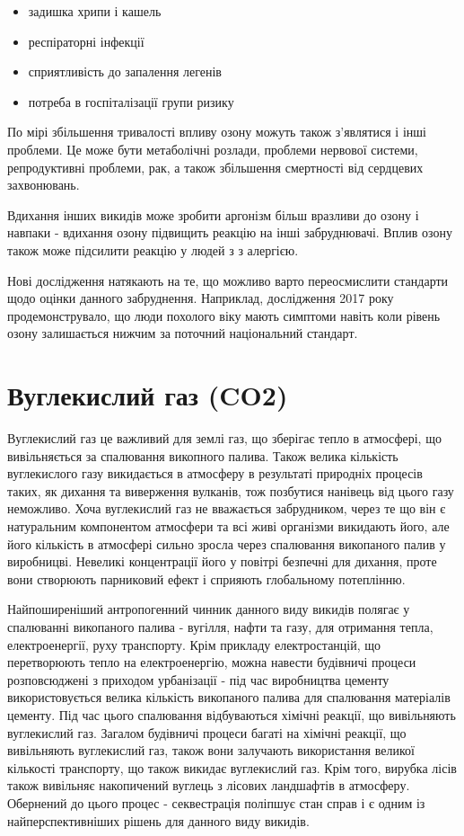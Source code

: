 \begin{itemize}
    \item задишка хрипи і кашель
    \item респіраторні інфекції
    \item сприятливість до запалення легенів
    \item потреба в госпіталізації групи ризику
\end{itemize}

По мірі збільшення тривалості впливу озону можуть також з'являтися і інші проблеми. Це може бути 
метаболічні розлади, проблеми нервової системи, репродуктивні проблеми, рак, а також збільшення 
смертності від сердцевих захвонювань. 

Вдихання інших викидів може зробити аргонізм більш вразливи до озону і навпаки - вдихання озону 
підвищить реакцію на інші забруднювачі. Вплив озону також може підсилити реакцію у людей з 
з алергією.

Нові дослідження натякають на те, що можливо варто переосмислити стандарти щодо оцінки данного
забруднення. Наприклад, дослідження 2017 року продемонструвало, що люди похолого віку мають 
симптоми навіть коли рівень озону залишається нижчим за поточний національний стандарт.


\section{Вуглекислий газ (CO2)}

Вуглекислий газ це важливий для землі газ, що зберігає тепло в атмосфері, що вивільняється за спалювання викопного палива. 
Також велика кількість вуглекислого газу викидається в атмосферу в результаті природніх процесів таких, як дихання та виверження вулканів, тож позбутися нанівець від цього газу неможливо. 
Хоча вуглекислий газ не вважається забрудником, через те що він є натуральним компонентом атмосфери та всі живі організми викидають його, але його кількість в атмосфері сильно зросла через спалювання викопаного палив у виробницві. 
Невеликі концентрації його у повітрі безпечні для дихання, проте вони створюють парниковий ефект і сприяють глобальному потеплінню.

Найпоширеніший антропогенний чинник данного виду викидів полягає у спалюванні викопаного палива - вугілля, нафти та газу, для отримання тепла, електроенергії, руху транспорту.
Крім прикладу електростанцій, що перетворюють тепло на електроенергію, можна навести будівничі процеси розповсюджені з приходом урбанізації - під час виробництва цементу використовується велика кількість викопаного палива для спалювання матеріалів цементу. 
Під час цього спалювання відбуваються хімічні реакції, що вивільняють вуглекислий газ.
Загалом будівничі процеси багаті на хімічні реакції, що вивільняють вуглекислий газ, також вони залучають використання великої кількості транспорту, що також викидає вуглекислий газ.
Крім того, вирубка лісів також вивільняє накопичений вуглець з лісових ландшафтів в атмосферу. 
Обернений до цього процес - секвестрація поліпшує стан справ і є одним із найперспективніших рішень для данного виду викидів.

